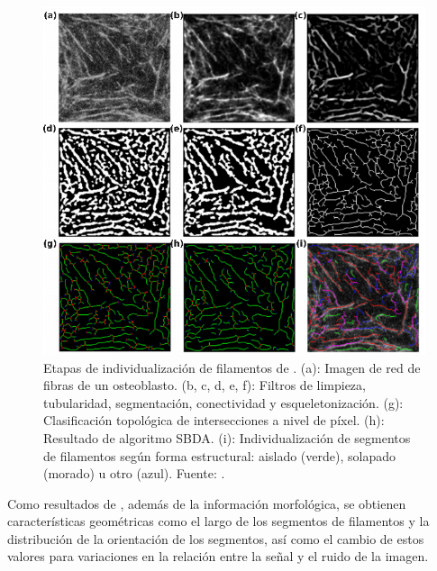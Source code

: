 \begin{figure}[h!]
        \includegraphics[scale=0.75]{imagenes/QuantitativeIFS.png}
        \caption[Etapas de individualizaci\'on de filamentos de \cite{qiu2014quantitative}.]{Etapas de individualizaci\'on de filamentos de \cite{qiu2014quantitative}. (a): Imagen de red de fibras de un osteoblasto. (b, c, d, e, f): Filtros de limpieza, tubularidad, segmentaci\'on, conectividad y esqueletonizaci\'on. (g): Clasificaci\'on topol\'ogica de intersecciones a nivel de p\'ixel. (h): Resultado de algoritmo SBDA. (i): Individualizaci\'on de segmentos de filamentos seg\'un forma estructural: aislado (verde), solapado (morado) u otro (azul). Fuente: \cite{qiu2014quantitative}.}
        \label{fig:IFS}
\end{figure}

Como resultados de \cite{qiu2014quantitative}, adem\'as de la informaci\'on morfol\'ogica, se obtienen caracter\'isticas geom\'etricas como el largo de los segmentos de  filamentos y la distribuci\'on de la orientaci\'on de los segmentos, as\'i como el cambio de estos valores para variaciones en la relaci\'on entre la se\~nal y el ruido de la imagen.


